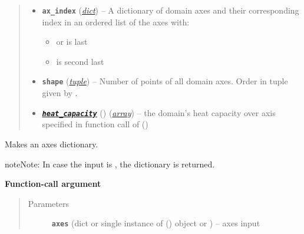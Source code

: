 \documentclass[a4paper,10pt,english]{sphinxmanual}
\begin{document}
\begin{fulllineitems}
\begin{quote}
\begin{description}
\begin{itemize}
\item {} 
\textbf{\texttt{ax\_index}} (\href{http://docs.python.org/2.7/library/stdtypes.html\#dict}{\emph{dict}}) -- 
A dictionary of domain axes and their corresponding index
in an ordered list of the axes with:
\begin{itemize}
\item {} 
 or  is last

\item {} 
 is second last

\end{itemize}


\item {} 
\textbf{\texttt{shape}} (\href{http://docs.python.org/2.7/library/functions.html\#tuple}{\emph{tuple}}) -- Number of points of all domain axes. Order in 
tuple given by .

\item {} 
{\hyperref[api/climlab.utils:module\string-climlab.utils.heat_capacity]{\emph{\textbf{\texttt{heat\_capacity}}}}} () (\href{http://docs.python.org/2.7/library/array.html\#module-array}{\emph{array}}) -- the domain's heat capacity over axis specified 
in function call of {\hyperref[api/climlab.domain:climlab.domain.domain._Domain.set_heat_capacity]{\emph{}}} ()

\end{itemize}

\end{description}\end{quote}

\begin{fulllineitems}
\label{api/climlab.domain:climlab.domain.domain._Domain._make_axes_dict}
Makes an axes dictionary.

\begin{notice}{note}{Note:}
In case the input is , the dictionary 
is returned.
\end{notice}

\textbf{Function-call argument}
\begin{quote}\begin{description}
\item[{Parameters}] \leavevmode
\textbf{\texttt{axes}} (dict or single instance of 
{\hyperref[api/climlab.domain:climlab.domain.axis.Axis]{\emph{}}} () object or ) -- axes input


\end{description}
\end{quote}
\end{fulllineitems}
\end{fulllineitems}
\end{document}
